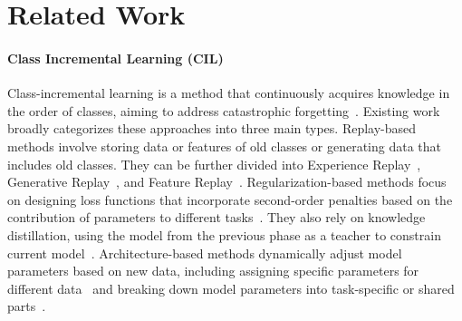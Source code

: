 \section{Related Work}
\label{sec:Related Work}

\paragraph{Class Incremental Learning (CIL)}
Class-incremental learning is a method that continuously acquires knowledge in the order of classes, aiming to address catastrophic forgetting~\citep{CF_mccloskey1989catastrophic}. Existing work~\citep{CIL_survey_wang2024comprehensive} broadly categorizes these approaches into three main types.
Replay-based methods involve storing data or features of old classes or generating data that includes old classes. They can be further divided into Experience Replay~\citep{iCaRL_rebuffi2017icarl, RM_bang2021rainbow}, Generative Replay~\citep{CIL_G_replay_liu2020generative, CIL_G_replay_shin2017continual}, and Feature Replay~\citep{CIL_F_replay_belouadah2019il2m}.
Regularization-based methods focus on designing loss functions that incorporate second-order penalties based on the contribution of parameters to different tasks~\citep{ewc_kirkpatrick2017overcoming, CIL_loss_jung2020continual}. They also rely on knowledge distillation, using the model from the previous phase as a teacher to constrain current model~\citep{lwf_li2017learning, iCaRL_rebuffi2017icarl, PODnet_douillard2020podnet, DER_buzzega2020dark}.
Architecture-based methods dynamically adjust model parameters based on new data, including assigning specific parameters for different data~\citep{CIL_archi_gurbuz2022nispa, CIL_archi_serra2018overcoming} and breaking down model parameters into task-specific or shared parts~\citep{DyTox_douillard2022dytox}.

